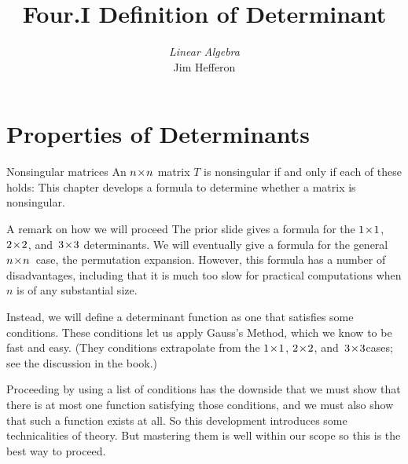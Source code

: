\documentclass[10pt,t]{beamer}
\title[Determinants] %
{Four.I Definition of Determinant}
\author{\textit{Linear Algebra} \\ {\small Jim Hef{}feron}}
\institute{
  \texttt{http://joshua.smcvt.edu/linearalgebra}
}
\date{}
\begin{document}
\begin{frame}
  \titlepage
\end{frame}




\section{Properties of Determinants}
\begin{frame}{Nonsingular matrices}
\noindent An \( n \! \times \! n \) matrix \( T \) is nonsingular if and only if
each of these holds:%
This chapter develops a formula to determine whether a
matrix is nonsingular.
\end{frame}




\begin{frame}
\end{frame}




\begin{frame}{A remark on how we will proceed}
The prior slide gives a formula for the $1 \! \times \! 1$, $2 \! \times \! 2$, and~$3 \! \times \! 3$
determinants. 
We will eventually give a formula for the general $n \! \times \! n$~case,
the permutation expansion.
However, this formula has a number of disadvantages, including that 
it is much too slow for practical computations when $n$ is of any
substantial size. 

Instead, we will define a
determinant function as one that satisfies some conditions. 
These conditions let us apply Gauss's Method, which we know to
be fast and easy.
(They conditions extrapolate from the $1 \! \times \! 1$, $2 \! \times \! 2$, 
and~$3 \! \times \! 3$cases; see the discussion in the book.) 

Proceeding by using a list of conditions has the downside that we must 
show that there is at most one function satisfying those conditions, and 
we must also show that such a function exists at all. 
So this development introduces some technicalities of theory.
But mastering them is well within our scope so this is the
best way to proceed.
\end{frame}
\end{document}
